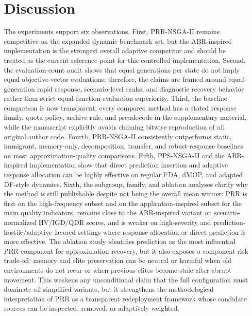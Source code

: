 \documentclass[1p,times]{elsarticle}
\begin{document}
\section{Discussion}
The experiments support six observations. First, PRR-NSGA-II remains competitive on the expanded dynamic benchmark set, but the ABR-inspired implementation is the strongest overall adaptive competitor and should be treated as the current reference point for this controlled implementation. Second, the evaluation-count audit shows that equal generations per state do not imply equal objective-vector evaluations; therefore, the claims are framed around equal-generation rapid response, scenario-level ranks, and diagnostic recovery behavior rather than strict equal-function-evaluation superiority. Third, the baseline comparison is now transparent: every compared method has a stated response family, quota policy, archive rule, and pseudocode in the supplementary material, while the manuscript explicitly avoids claiming bitwise reproduction of all original author code. Fourth, PRR-NSGA-II consistently outperforms static, immigrant, memory-only, decomposition, transfer, and robust-response baselines on most approximation-quality comparisons. Fifth, PPS-NSGA-II and the ABR-inspired implementation show that direct prediction insertion and adaptive response allocation can be highly effective on regular FDA, dMOP, and adapted DF-style dynamics. Sixth, the subgroup, family, and ablation analyses clarify why the method is still publishable despite not being the overall mean winner: PRR is first on the high-frequency subset and on the application-inspired subset for the main quality indicators, remains close to the ABR-inspired variant on scenario-normalized HV/IGD/QDR scores, and is weaker on high-severity and prediction-hostile/adaptive-favored settings where response allocation or direct prediction is more effective. The ablation study identifies prediction as the most influential PRR component for approximation recovery, but it also exposes a component-risk trade-off: memory and elite preservation can be neutral or harmful when old environments do not recur or when previous elites become stale after abrupt movement. This weakens any unconditional claim that the full configuration must dominate all simplified variants, but it strengthens the methodological interpretation of PRR as a transparent redeployment framework whose candidate sources can be inspected, removed, or adaptively weighted.
\end{document}
